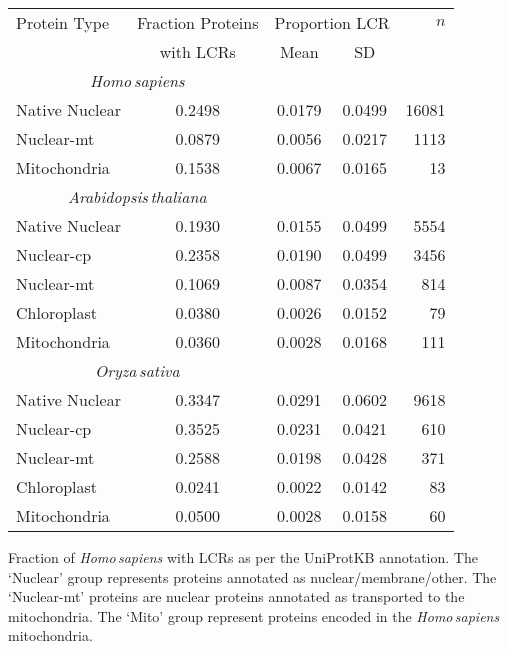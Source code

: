 \documentclass[a4paper,12pt]{article}
\newcommand{\arab}{\mbox{\textit{Arabidopsis\,thaliana}}\xspace}
\newcommand{\oryz}{\mbox{\textit{Oryza\,sativa}}\xspace}
\newcommand{\homo}{\mbox{\textit{Homo\,sapiens}}\xspace}
\begin{document}
\begin{table*}
    \caption{Fraction of Proteins with LCRs using annotated subcellular localization}
    \label{tab:sublocal}
    \centering
    \begin{tabular}{lcccr}
        \toprule
        Protein Type & Fraction Proteins & \multicolumn{2}{c}{Proportion LCR} & $n$ \\
                     & with LCRs         & Mean & SD &      \\
        \midrule \multicolumn{2}{c}{\quad\quad\homo} &       & & \\
        Native Nuclear & 0.2498 & 0.0179 & 0.0499 & 16081 \\
        Nuclear-mt  & 0.0879 & 0.0056 & 0.0217 & 1113 \\
        Mitochondria   & 0.1538 & 0.0067 & 0.0165 & 13 \\
        \midrule \multicolumn{2}{c}{\quad\quad\arab} &      & & \\
        Native Nuclear & 0.1930 & 0.0155 & 0.0499 & 5554 \\
        Nuclear-cp   & 0.2358 & 0.0190 & 0.0499 & 3456 \\
        Nuclear-mt  & 0.1069 & 0.0087 & 0.0354 & 814 \\
        Chloroplast    & 0.0380 & 0.0026 & 0.0152 & 79 \\
        Mitochondria   & 0.0360 & 0.0028 & 0.0168 & 111 \\
        \midrule \multicolumn{2}{c}{\quad\quad\oryz} &     & & \\
        Native Nuclear & 0.3347 & 0.0291 & 0.0602 & 9618 \\
        Nuclear-cp   & 0.3525 & 0.0231 & 0.0421 & 610 \\
        Nuclear-mt  & 0.2588 & 0.0198 & 0.0428 & 371 \\
        Chloroplast    & 0.0241 & 0.0022 & 0.0142 & 83 \\
        Mitochondria   & 0.0500 & 0.0028 & 0.0158 & 60 \\
        \bottomrule
    \end{tabular}
\end{table*}


\renewcommand{\location}{homo_genbank_lcrproportions}
\renewcommand{\nucNumber}{16081}
\renewcommand{\nucMitoNumber}{1113}
\renewcommand{\mitoNumber}{13}
\begin{figure*}[ht]
    \caption{UniProtKB -- \homo}
    
    \centering\parbox{0.9\textwidth}{\footnotesize Fraction of \homo
    with LCRs as per the UniProtKB annotation.  The `Nuclear' group represents
    proteins annotated as nuclear/membrane/other. 
    The `Nuclear-mt' proteins are nuclear proteins annotated as transported
    to the mitochondria.  The `Mito' group represent proteins
    encoded in the \homo mitochondria.}
    \label{fig:histogramgenbankhomo}
\end{figure*}
\end{document}

